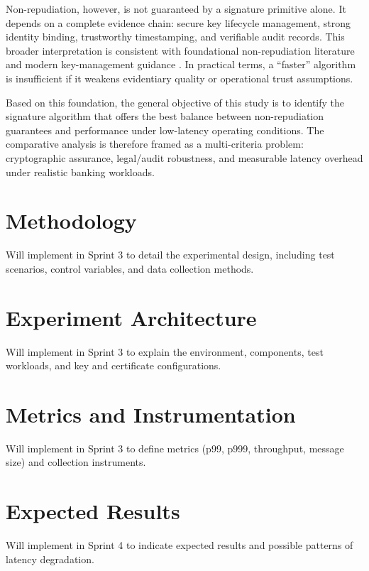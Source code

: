 \documentclass[12pt]{article}
\begin{document}
Non-repudiation, however, is not guaranteed by a signature primitive alone. It depends on a complete evidence chain: secure key lifecycle management, strong identity binding, trustworthy timestamping, and verifiable audit records. This broader interpretation is consistent with foundational non-repudiation literature \cite{zhou2001} and modern key-management guidance \cite{sp80057}. In practical terms, a ``faster'' algorithm is insufficient if it weakens evidentiary quality or operational trust assumptions.

Based on this foundation, the general objective of this study is to identify the signature algorithm that offers the best balance between non-repudiation guarantees and performance under low-latency operating conditions. The comparative analysis is therefore framed as a multi-criteria problem: cryptographic assurance, legal/audit robustness, and measurable latency overhead under realistic banking workloads.

\section{Methodology}
Will implement in Sprint 3 to detail the experimental design, including test scenarios, control variables, and data collection methods.

\section{Experiment Architecture}
Will implement in Sprint 3 to explain the environment, components, test workloads, and key and certificate configurations.

\section{Metrics and Instrumentation}
Will implement in Sprint 3 to define metrics (p99, p999, throughput, message size) and collection instruments.

\section{Expected Results}
Will implement in Sprint 4 to indicate expected results and possible patterns of latency degradation.
\end{document}
